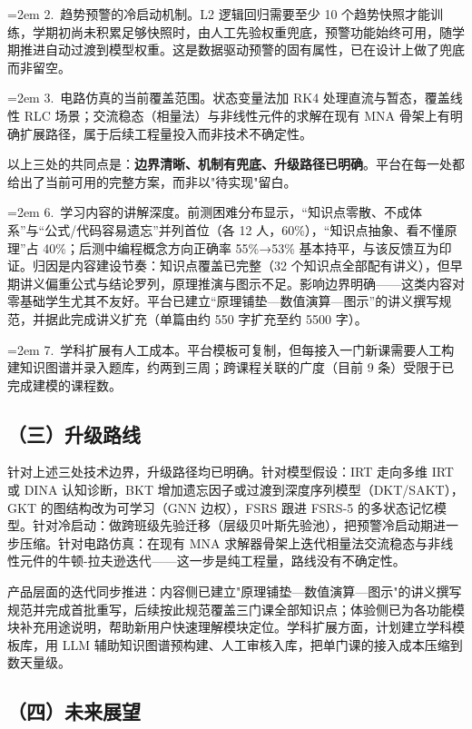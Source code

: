 \documentclass[zihao=-4,a4paper,UTF8,fontset=windows]{ctexart}
\begin{document}
\noindent\hangindent=2em 2.~趋势预警的冷启动机制。L2 逻辑回归需要至少 10 个趋势快照才能训练，学期初尚未积累足够快照时，由人工先验权重兜底，预警功能始终可用，随学期推进自动过渡到模型权重。这是数据驱动预警的固有属性，已在设计上做了兜底而非留空。

\noindent\hangindent=2em 3.~电路仿真的当前覆盖范围。状态变量法加 RK4 处理直流与暂态，覆盖线性 RLC 场景；交流稳态（相量法）与非线性元件的求解在现有 MNA 骨架上有明确扩展路径，属于后续工程量投入而非技术不确定性。

以上三处的共同点是：\textbf{边界清晰、机制有兜底、升级路径已明确}。平台在每一处都给出了当前可用的完整方案，而非以"待实现"留白。

\noindent\hangindent=2em 6.~学习内容的讲解深度。前测困难分布显示，“知识点零散、不成体系”与“公式/代码容易遗忘”并列首位（各 12 人，60\%），“知识点抽象、看不懂原理”占 40\%；后测中编程概念方向正确率 55\%→53\% 基本持平，与该反馈互为印证。归因是内容建设节奏：知识点覆盖已完整（32 个知识点全部配有讲义），但早期讲义偏重公式与结论罗列，原理推演与图示不足。影响边界明确——这类内容对零基础学生尤其不友好。平台已建立“原理铺垫—数值演算—图示”的讲义撰写规范，并据此完成讲义扩充（单篇由约 550 字扩充至约 5500 字）。

\noindent\hangindent=2em 7.~学科扩展有人工成本。平台模板可复制，但每接入一门新课需要人工构建知识图谱并录入题库，约两到三周；跨课程关联的广度（目前 9 条）受限于已完成建模的课程数。

\subsection{（三）升级路线}


针对上述三处技术边界，升级路径均已明确。针对模型假设：IRT 走向多维 IRT 或 DINA 认知诊断，BKT 增加遗忘因子或过渡到深度序列模型（DKT/SAKT），GKT 的图结构改为可学习（GNN 边权），FSRS 跟进 FSRS-5 的多状态记忆模型。针对冷启动：做跨班级先验迁移（层级贝叶斯先验池），把预警冷启动期进一步压缩。针对电路仿真：在现有 MNA 求解器骨架上迭代相量法交流稳态与非线性元件的牛顿-拉夫逊迭代——这一步是纯工程量，路线没有不确定性。

产品层面的迭代同步推进：内容侧已建立"原理铺垫—数值演算—图示"的讲义撰写规范并完成首批重写，后续按此规范覆盖三门课全部知识点；体验侧已为各功能模块补充用途说明，帮助新用户快速理解模块定位。学科扩展方面，计划建立学科模板库，用 LLM 辅助知识图谱预构建、人工审核入库，把单门课的接入成本压缩到数天量级。

\subsection{（四）未来展望}
\end{document}
